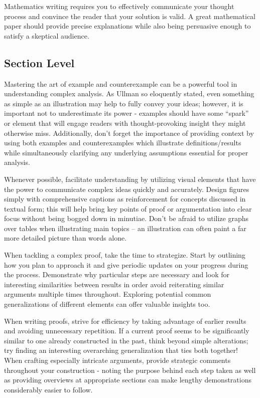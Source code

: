 \documentclass[
  twoside,
  12pt,
  letterpaper,
  fleqn]{article}
\begin{document}
Mathematics writing requires you to effectively communicate your thought
process and convince the reader that your solution is valid. A great
mathematical paper should provide precise explanations while also being
persuasive enough to satisfy a skeptical audience.

\hypertarget{section-level}{%
\subsection{Section Level}\label{section-level}}

Mastering the art of example and counterexample can be a powerful tool
in understanding complex analysis. As Ullman so eloquently stated, even
something as simple as an illustration may help to fully convey your
ideas; however, it is important not to underestimate its power -
examples should have some ``spark'' or element that will engage readers
with thought-provoking insight they might otherwise miss. Additionally,
don't forget the importance of providing context by using both examples
and counterexamples which illustrate definitions/results while
simultaneously clarifying any underlying assumptions essential for
proper analysis.

Whenever possible, facilitate understanding by utilizing visual elements
that have the power to communicate complex ideas quickly and accurately.
Design figures simply with comprehensive captions as reinforcement for
concepts discussed in textual form; this will help bring key points of
proof or argumentation into clear focus without being bogged down in
minutiae. Don't be afraid to utilize graphs over tables when
illustrating main topics -- an illustration can often paint a far more
detailed picture than words alone.

When tackling a complex proof, take the time to strategize. Start by
outlining how you plan to approach it and give periodic updates on your
progress during the process. Demonstrate why particular steps are
necessary and look for interesting similarities between results in order
avoid reiterating similar arguments multiple times throughout. Exploring
potential common generalizations of different elements can offer
valuable insights too.

When writing proofs, strive for efficiency by taking advantage of
earlier results and avoiding unnecessary repetition. If a current proof
seems to be significantly similar to one already constructed in the
past, think beyond simple alterations; try finding an interesting
overarching generalization that ties both together! When crafting
especially intricate arguments, provide strategic comments throughout
your construction - noting the purpose behind each step taken as well as
providing overviews at appropriate sections can make lengthy
demonstrations considerably easier to follow.
\end{document}
